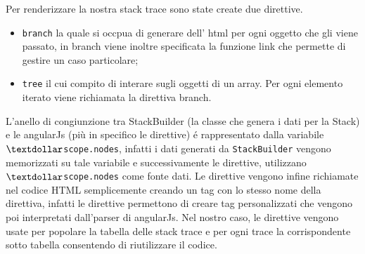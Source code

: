 Per renderizzare la nostra stack trace sono state create due direttive. 
\begin{itemize} 
	\item \texttt{branch} la quale si occpua di generare dell' html per ogni oggetto che gli viene passato, 
	in branch viene inoltre specificata la funzione link che permette di gestire un caso particolare;
	\item \texttt{tree} il cui compito di interare sugli oggetti di un array. Per ogni elemento iterato viene richiamata 
	la direttiva branch. 
\end{itemize} 

L'anello di congiunzione tra StackBuilder (la classe che genera i dati per la Stack) e le angularJs (più in specifico le direttive) 
é rappresentato dalla variabile \texttt{$\textdollar$scope.nodes}, infatti i dati generati da \texttt{StackBuilder} vengono memorizzati su tale variabile e successivamente le direttive, utilizzano \texttt{$\textdollar$scope.nodes} come fonte dati. Le direttive vengono infine richiamate nel codice HTML semplicemente creando un 
tag con lo stesso nome della direttiva, infatti le direttive permettono di creare 
tag personalizzati che vengono poi interpretati dall'parser di angularJs. 
Nel nostro caso, le direttive vengono usate per popolare la tabella delle stack trace 
e per ogni trace la corrispondente sotto tabella consentendo di riutilizzare il codice.